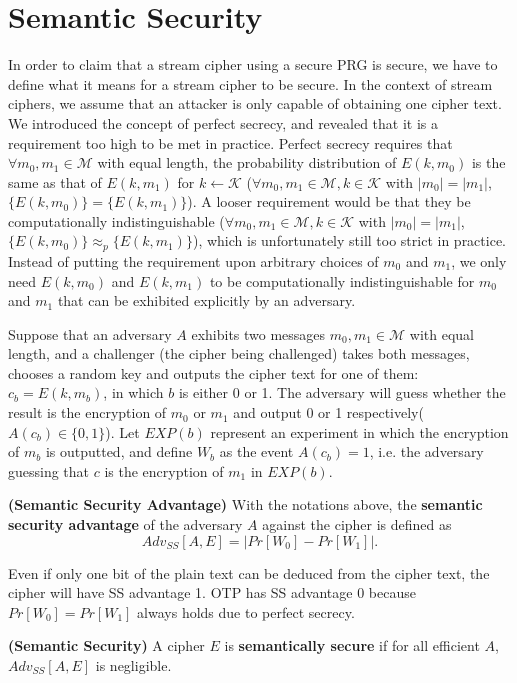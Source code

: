 \section{Semantic Security}
In order to claim that a stream cipher using a secure PRG is secure, we have to define what it means for a stream cipher to be secure. In the context of stream ciphers, we assume that an attacker is only capable of obtaining one cipher text. We introduced the concept of perfect secrecy, and revealed that it is a requirement too high to be met in practice. Perfect secrecy requires that $\forall m_0,m_1\in\mathcal{M}$ with equal length, the probability distribution of $E(k,m_0)$ is the same as that of $E(k,m_1)$ for $k\leftarrow\mathcal{K}$ ($\forall m_0,m_1\in\mathcal{M}, k\in\mathcal{K}$ with $\lvert m_0\rvert=\lvert m_1\rvert$, $\{E(k, m_0)\}=\{E(k, m_1)\}$). A looser requirement would be that they be computationally indistinguishable ($\forall m_0,m_1\in\mathcal{M}, k\in\mathcal{K}$ with $\lvert m_0\rvert=\lvert m_1\rvert$, $\{E(k, m_0)\}\approx_p\{E(k, m_1)\}$), which is unfortunately still too strict in practice. Instead of putting the requirement upon arbitrary choices of $m_0$ and $m_1$, we only need $E(k,m_0)$ and $E(k,m_1)$ to be computationally indistinguishable for $m_0$ and $m_1$ that can be exhibited explicitly by an adversary. 

Suppose that an adversary $A$ exhibits two messages $m_0,m_1\in\mathcal{M}$ with equal length, and a challenger (the cipher being challenged) takes both messages, chooses a random key and outputs the cipher text for one of them: $c_b=E(k,m_b)$, in which $b$ is either 0 or 1. The adversary will guess whether the result is the encryption of $m_0$ or $m_1$ and output 0 or 1 respectively($A(c_b)\in\{0,1\}$). Let $EXP(b)$ represent an experiment in which the encryption of $m_b$ is outputted, and define $W_b$ as the event $A(c_b)=1$, i.e. the adversary guessing that $c$ is the encryption of $m_1$ in $EXP(b)$. 
\begin{definition}\textbf{(Semantic Security Advantage)}
With the notations above, the \textbf{semantic security advantage} of the adversary $A$ against the cipher is defined as 
\[Adv_{SS}[A,E]=\left\lvert Pr[W_0]-Pr[W_1]\right\rvert.\]
\end{definition}
Even if only one bit of the plain text can be deduced from the cipher text, the cipher will have SS advantage 1. OTP has SS advantage 0 because $Pr[W_0]=Pr[W_1]$ always holds due to perfect secrecy.
\begin{definition}\textbf{(Semantic Security)}
A cipher $E$ is \textbf{semantically secure} if for all efficient $A$, $Adv_{SS}[A,E]$ is negligible.
\end{definition}


